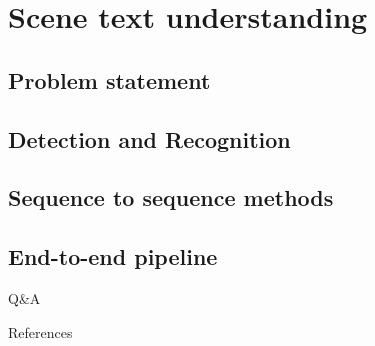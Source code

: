 \documentclass[aspectratio=169]{beamer}
\begin{document}
\section{Scene text understanding}
\subsection{Problem statement}
\subsection{Detection and Recognition}
\subsection{Sequence to sequence methods}
\subsection{End-to-end pipeline}

\begin{frame}[standout]
  Q\&A
\end{frame}

\begin{frame}[allowframebreaks]{References}
    \printbibliography
\end{frame}

\appendix
\end{document}
